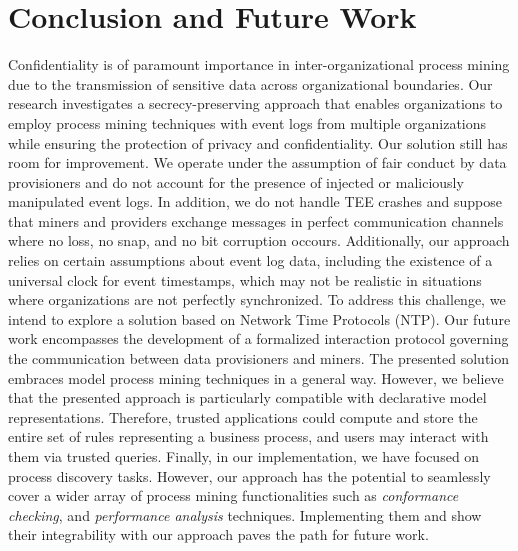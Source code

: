 \section{Conclusion and Future Work}
\label{sec:conclusion}
Confidentiality is of paramount importance in inter-organizational process mining due to the transmission of sensitive data across organizational boundaries. Our research investigates a secrecy-preserving approach that enables organizations to employ process mining techniques with event logs from multiple organizations while ensuring the protection of privacy and confidentiality. Our solution still has room for improvement. We operate under the assumption of fair conduct by data provisioners and do not account for the presence of injected or maliciously manipulated event logs. In addition, we do not handle TEE crashes and suppose that miners and providers exchange messages in perfect communication channels where no loss, no snap, and no bit corruption occours. Additionally, our approach relies on certain assumptions about event log data, including the existence of a universal clock for event timestamps, which may not be realistic in situations where organizations are not perfectly synchronized. To address this challenge, we intend to explore a solution based on Network Time Protocols (NTP). Our future work encompasses the development of a formalized interaction protocol governing the communication between data provisioners and miners. The presented solution embraces model process mining techniques in a general way. However, we believe that the presented approach is particularly compatible with declarative model representations. Therefore, trusted applications could compute and store the entire set of rules representing a business process, and users may interact with them via trusted queries. Finally, in our implementation, we have focused on process discovery tasks. However, our approach has the potential to seamlessly cover a wider array of process mining functionalities such as \textit{conformance checking}, and \textit{performance analysis} techniques. Implementing them and show their integrability with our approach paves the path for future work. 

